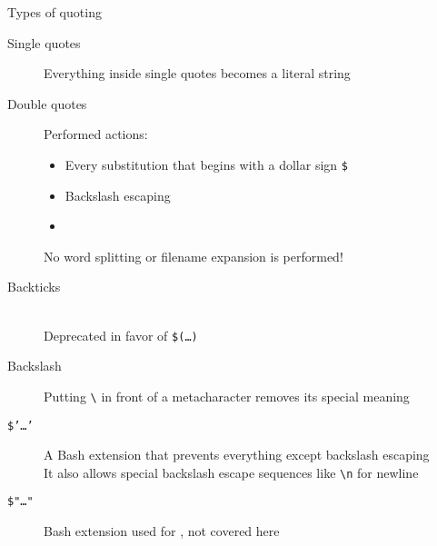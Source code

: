 
\begin{frame}[label={Quotes}]{Types of quoting}
    \vspace{-3mm}
    \begin{description}
        \item[Single quotes] Everything inside single quotes becomes a literal string\\[-0.3em]
        \item[Double quotes] Performed actions:
                             \begin{itemize}
                                 \item Every substitution that begins with a dollar sign \texttt{\$}
                                 \item Backslash escaping
                                 \item {}
                             \end{itemize}
                             \alert{No word splitting or filename expansion is performed!}
        \item[Backticks] \\
                         \alert{Deprecated in favor of \texttt{\$(\ldots)}}
        \item[Backslash] Putting \texttt{\textbackslash} in front of a metacharacter removes its special meaning\\[-0.3em]
        \item[\texttt{\$'\ldots'}] A Bash extension that prevents everything except backslash escaping\\
                                   It also allows special backslash escape sequences like \texttt{\textbackslash{}n} for newline%
        \item[\texttt{\$"\ldots"}] Bash extension used for , not covered here
    \end{description}
    \PrepareURLsymbol[PB]
\end{frame}
